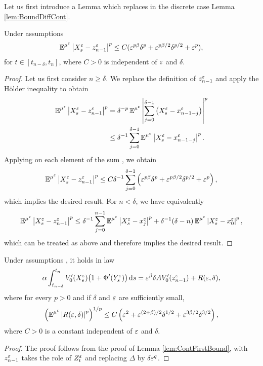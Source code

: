 \documentclass[10pt]{article}
\begin{document}
Let us first introduce a Lemma which replaces in the discrete case Lemma \ref{lem:BoundDiffCont}.
\begin{lemma}\label{lem:BoundDiff} Under assumptions 
	\begin{equation}
		\operatorname{\mathbb{E}}^{\mu^\varepsilon}\left\lvert X_s^\varepsilon - z^\varepsilon_{n-1}\right\rvert^p \leq C(\varepsilon^{p\beta}\delta^p + \varepsilon^{p\beta/2}\delta^{p/2} + \varepsilon^p),
	\end{equation}
	for $t \in [t_{n-\delta}, t_n]$, where $C > 0$ is independent of $\varepsilon$ and $\delta$.
\end{lemma}
\begin{proof} Let us first consider $n \geq \delta$. We replace the definition of $z^\varepsilon_{n-1}$ and apply the Hölder inequality to obtain
	\begin{equation}
	\begin{aligned}
		\operatorname{\mathbb{E}}^{\mu^\varepsilon}\left\lvert X_s^\varepsilon - z^\varepsilon_{n-1}\right\rvert^p &= \delta^{-p} \operatorname{\mathbb{E}}^{\mu^\varepsilon} \left\lvert\sum_{j=0}^{\delta-1}\left(X_s^\varepsilon - x^\varepsilon_{n-1-j}\right)\right\rvert^p \\
		&\leq \delta^{-1}\sum_{j=0}^{\delta-1} \operatorname{\mathbb{E}}^{\mu^\varepsilon}\left\lvert X_s^\varepsilon - x^\varepsilon_{n-1-j}\right\rvert^p.
	\end{aligned}
	\end{equation}
	Applying on each element of the sum \cite[Lemma 6.1]{PaS07}, we obtain
	\begin{equation}
		\operatorname{\mathbb{E}}^{\mu^\varepsilon}\left\lvert X_s^\varepsilon - z^\varepsilon_{n-1}\right\rvert^p \leq C \delta^{-1} \sum_{j=0}^{\delta-1} \left(\varepsilon^{p\beta}\delta^p + \varepsilon^{p\beta/2}\delta^{p/2} + \varepsilon^p\right),
	\end{equation}
	which implies the desired result. For $n < \delta$, we have equivalently
	\begin{equation}
		\operatorname{\mathbb{E}}^{\mu^\varepsilon}\left\lvert X_s^\varepsilon - z^\varepsilon_{n-1}\right\rvert^p \leq \delta^{-1}\sum_{j=0}^{n-1}\operatorname{\mathbb{E}}^{\mu^\varepsilon}\left\lvert X_s^\varepsilon - x^\varepsilon_j\right\rvert^p + \delta^{-1}(\delta - n)\operatorname{\mathbb{E}}^{\mu^\varepsilon}\left\lvert X_s^\varepsilon - x^\varepsilon_0\right\rvert^p,
	\end{equation}
	which can be treated as above and therefore implies the desired result.
\end{proof}

\begin{lemma}\label{lem:DiscFirstBound} Under assumptions , it holds in law
	\begin{equation}
		\alpha\int_{t_{n-\delta}}^{t_n} V_0'(X^\varepsilon_s)\big(1 + \Phi'(Y^\varepsilon_s)\big)\,\mathrm{d} s = \varepsilon^\beta \delta A V_0'(z^\varepsilon_{n-1}) + R(\varepsilon, \delta),
	\end{equation}
	where for every $p > 0$ and if $\delta$ and $\varepsilon$ are sufficiently small,
	\begin{equation}
		\left(\operatorname{\mathbb{E}}^{\mu^\varepsilon}\left\lvert R(\varepsilon, \delta)\right\rvert^p\right)^{1/p}\leq C\left(\varepsilon^2 + \varepsilon^{(2+\beta)/2}\delta^{1/2} + \varepsilon^{3\beta/2} \delta^{3/2} \right),
	\end{equation}
	where $C > 0$ is a constant independent of $\varepsilon$ and $\delta$.
\end{lemma}
\begin{proof} The proof follows from the proof of Lemma \ref{lem:ContFirstBound}, with $z_{n-1}^\varepsilon$ takes the role of $Z_t^\varepsilon$ and replacing $\Delta$ by $\delta\varepsilon^q$.
\end{proof}
\end{document}
